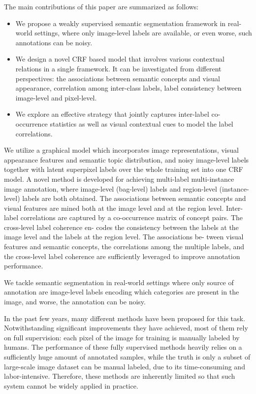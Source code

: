 The main contributions of this paper are summarized as follows:
\begin{itemize}
  \item We propose a weakly supervised semantic segmentation framework in real-world settings, where only image-level labels are available, or even worse, such annotations can be noisy.
  \item We design a novel CRF based model that involves various contextual relations in a single framework. It can be investigated from different perspectives: the associations between semantic concepts and visual appearance, correlation among inter-class labels, label consistency between image-level and pixel-level.
  \item We explore an effective strategy that jointly captures inter-label co-occurrence statistics as well as visual contextual cues to model the label correlations.
\end{itemize}

\if

 We utilize a graphical model which incorporates image representations, visual appearance features and semantic topic distribution, and noisy image-level labels together with latent superpixel labels over the whole training set into one CRF model. A novel method is developed for achieving multi-label multi-instance image annotation, where image-level (bag-level) labels and region-level (instance-level) labels are both obtained. The associations between semantic concepts and visual features are mined both at the image level and at the region level. Inter-label correlations are captured by a co-occurrence matrix of concept pairs. The cross-level label coherence en- codes the consistency between the labels at the image level and the labels at the region level. The associations be- tween visual features and semantic concepts, the correlations among the multiple labels, and the cross-level label coherence are sufficiently leveraged to improve annotation performance.

We tackle semantic segmentation in real-world settings where only source of annotation are image-level labels encoding which categories are present in the image, and worse, the annotation can be noisy.

In the past few years, many different methods \cite{csurka2011efficient,gonfaus2010harmony,ladicky2009associative,nowozin2010parameter,shotton2008semantic,shotton2006textonboost,singh2013nonparametric,verbeek2007scene,yang2007multiple,yao2012describing} have been proposed for this task. Notwithstanding significant improvements they have achieved, most of them rely on full supervision: each pixel of the image for training is manually labeled by humans. The performance of these fully supervised methods heavily relies on a sufficiently huge amount of annotated samples, while the truth is only a subset of large-scale image dataset can be manual labeled, due to its time-consuming and labor-intensive. Therefore, these methods are inherently limited so that such system cannot be widely applied in practice.

